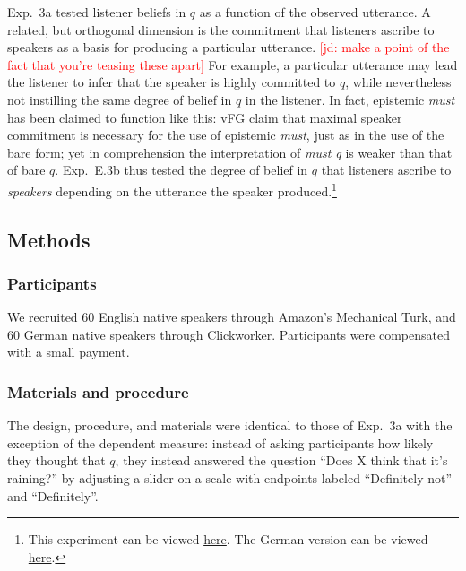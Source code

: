 \documentclass[11pt]{article}
\newcommand{\jd}[1]{\textcolor{Red}{[jd: #1]}}
\begin{document}

Exp.~3a tested listener beliefs in $q$ as a function of the observed utterance. A related, but orthogonal dimension is the commitment that listeners ascribe to speakers as a basis for producing a particular utterance. \jd{make a point of the fact that you're teasing these apart} For example, a particular utterance may lead the listener to infer that the speaker is highly committed to $q$, while nevertheless not instilling the same degree of belief in $q$ in the listener. In fact, epistemic \emph{must} has been claimed to function like this: vFG claim that maximal speaker commitment is necessary for the use of epistemic \emph{must}, just as in the use of the bare form; yet in comprehension the interpretation of \emph{must q} is weaker than that of bare $q$.  Exp.~E.3b thus tested the degree of belief in $q$ that listeners ascribe to \emph{speakers} depending on the utterance the speaker produced.\footnote{This experiment can be viewed \href{http://stanford.edu/~jdegen/80_modals_comprehension_speakerbelief/modals.html}{here}. The German version can be viewed \href{http://web.stanford.edu/~jdegen/cgi-bin/1_dp_comprehension_speakerbelief/discourse_particles.html}{here}.}

\subsection{Methods}

\subsubsection{Participants}

We recruited 60 English native speakers through Amazon's Mechanical Turk, and 60 German native speakers through Clickworker. Participants were compensated with a small payment.

\subsubsection{Materials and procedure}

The design, procedure, and materials were identical to those of Exp.~3a with the exception of the dependent measure: instead of asking participants how likely they thought that $q$, they instead answered the question ``Does X think that it's raining?'' by adjusting a slider on a scale with endpoints labeled ``Definitely not'' and ``Definitely''. 
\end{document}
